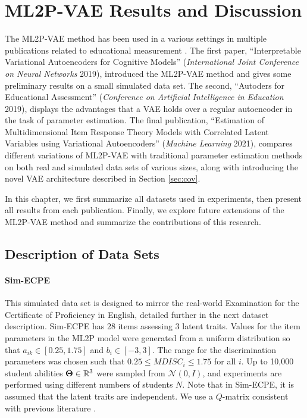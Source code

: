 \chapter{ML2P-VAE Results and Discussion}\label{ch:ml2pvae_results}

The ML2P-VAE method has been used in a various settings in multiple publications related to educational measurement \cite{ijcnn_paper, aied_paper, ml_paper}. The first paper, ``Interpretable Variational Autoencoders for Cognitive Models'' (\textit{International Joint Conference on Neural Networks} 2019), introduced the ML2P-VAE method and gives some preliminary results on a small simulated data set. The second, ``Autoders for Educational Assessment'' (\textit{Conference on Artificial Intelligence in Education} 2019), displays the advantages that a VAE holds over a regular autoencoder in the task of parameter estimation. The final publication, ``Estimation of Multidimensional Item Response Theory Models with Correlated Latent Variables using Variational Autoencoders'' (\textit{Machine Learning} 2021), compares different variations of ML2P-VAE with traditional parameter estimation methods on both real and simulated data sets of various sizes, along with introducing the novel VAE architecture described in Section \ref{sec:cov}.

In this chapter, we first summarize all datasets used in experiments, then present all results from each publication. Finally, we explore future extensions of the ML2P-VAE method and summarize the contributions of this research.

\section{Description of Data Sets}\label{sec:irt_data}
\subsubsection*{Sim-ECPE} This simulated data set is designed to mirror the real-world Examination for the Certificate of Proficiency in English, detailed further in the next dataset description. Sim-ECPE has 28 items assessing 3 latent traits. Values for the item parameters in the ML2P model were generated from a uniform distribution so that $a_{ik} \in [0.25, 1.75]$ and $b_i \in [-3,3]$. The range for the discrimination parameters was chosen such that $0.25 \leq MDISC_i \leq 1.75$ for all $i$. Up to 10,000 student abilities $\boldsymbol{\Theta} \in \mathbb{R}^3$ were sampled from $\mathcal{N}(0,I)$, and experiments are performed using different numbers of students $N$. Note that in Sim-ECPE, it is assumed that the latent traits are independent. We use a $Q$-matrix consistent with previous literature \cite{daSilva2018, templin2013, henson2007}.

